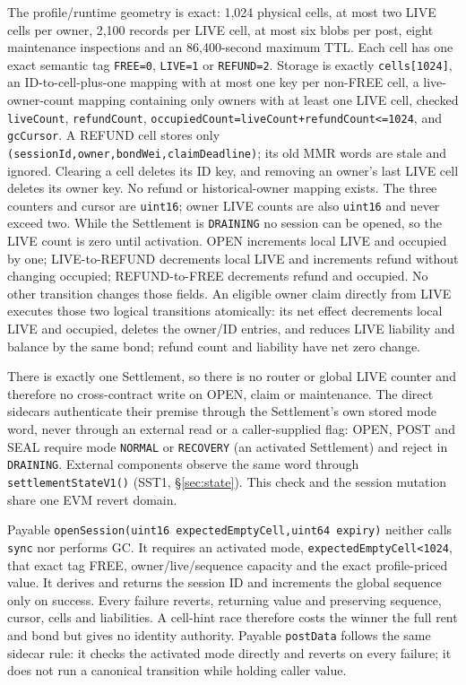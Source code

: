 \documentclass[a4paper,11pt]{article}
\newcommand{\code}[1]{\nolinkurl{#1}}
\begin{document}
The profile/runtime geometry is exact: 1,024 physical cells, at most two LIVE
cells per owner, 2,100 records per LIVE cell, at most six blobs per post, eight
maintenance inspections and an 86,400-second maximum TTL.  Each cell has one
exact semantic tag \code{FREE=0}, \code{LIVE=1} or \code{REFUND=2}.  Storage is exactly
\code{cells[1024]}, an ID-to-cell-plus-one mapping with at most one key per
non-FREE cell, a live-owner-count mapping containing only owners with at least
one LIVE cell, checked \code{liveCount}, \code{refundCount},
\code{occupiedCount=liveCount+refundCount<=1024}, and \code{gcCursor}.  A
REFUND cell stores only \code{(sessionId,owner,bondWei,claimDeadline)}; its old
MMR words are stale and ignored.  Clearing a cell deletes its ID key, and
removing an owner's last LIVE cell deletes its owner key.  No refund or
historical-owner mapping exists.
The three counters and cursor are \code{uint16}; owner LIVE counts are also
\code{uint16} and never exceed two.  While the Settlement is \code{DRAINING}
no session can be opened, so the LIVE count is zero until activation.  OPEN
increments local LIVE and occupied by one;
LIVE-to-REFUND decrements local LIVE and increments refund without
changing occupied; REFUND-to-FREE decrements refund and occupied.  No other
transition changes those fields.  An eligible owner claim directly from LIVE
executes those two logical transitions atomically: its net effect decrements
local LIVE and occupied, deletes the owner/ID entries, and reduces LIVE
liability and balance by the same bond; refund count and liability have net zero
change.

There is exactly one Settlement, so there is no router or global LIVE counter
and therefore no cross-contract write on OPEN, claim or maintenance.  The
direct sidecars authenticate their premise through the Settlement's own stored
mode word, never through an external read or a caller-supplied flag: OPEN,
POST and SEAL require mode \code{NORMAL} or \code{RECOVERY} (an activated
Settlement) and reject in \code{DRAINING}.  External components observe the
same word through \code{settlementStateV1()} (SST1, \S\ref{sec:state}).  This
check and the session mutation share one EVM revert domain.

Payable \code{openSession(uint16 expectedEmptyCell,uint64 expiry)} neither calls
\code{sync} nor performs GC.  It requires an activated mode,
\code{expectedEmptyCell<1024}, that exact tag FREE,
owner/live/sequence capacity and the exact profile-priced value.  It derives and
returns the session ID and increments the global sequence only on success.
Every failure reverts, returning value and preserving sequence, cursor, cells
and liabilities.  A cell-hint race therefore costs the winner the full rent and
bond but gives no identity authority.  Payable \code{postData} follows the same
sidecar rule: it checks the activated mode directly and reverts on every
failure; it does not run a canonical transition while holding caller value.
\end{document}
